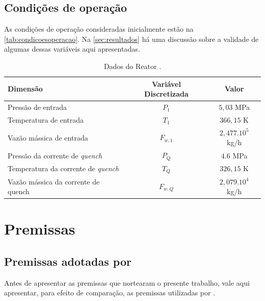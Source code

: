 
\subsection{Condições de operação} \label{sec:condicaocomposicaocorrentes}

As condições de operação consideradas inicialmente estão na
\autoref{tab:condicoesoperacao}. Na \autoref{sec:resultados} há uma discussão
sobre a validade de algumas dessas variáveis aqui apresentadas.

\begin{table}[!htb]
\begin{center}
\caption{Dados do Reator \cite{Rojas2014a}.}
\label{tab:condicoesoperacao}
\small
\begin{tabular}{lcc}
{Dimensão} & {Variável Discretizada} & {Valor}
\\
\hline
{Pressão de entrada} & {$P_{1}$} & $5,03$ MPa \\
{Temperatura de entrada} & {$T_{1}$} & $366,15$ K \\
{Vazão mássica de entrada} & {$F_{w,1}$} & $2,477.10^5$ kg/h \\
{Pressão da corrente de \emph{quench}} & {$P_{Q}$} & $4.6$ MPa \\
{Temperatura da corrente de \emph{quench}} & {$T_{Q}$} & $326,15$ K \\
{Vazão mássica da corrente de quench} & {$F_{w,Q}$} & $2,079.10^4$ kg/h \\
\bottomrule
\end{tabular}
\end{center}
\end{table}

\section{Premissas} \label{sec:premissas}

\subsection{Premissas adotadas por }
\label{sec:premissasrojas}

Antes de apresentar as premissas que nortearam o presente trabalho, vale
aqui apresentar, para efeito de comparação, as premissas utilizadas por
.

